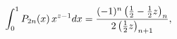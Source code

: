 \[\int_{0}^{1}\mathop{P_{2n}\/}\nolimits\!\left(x\right)x^{z-1}dx=\frac{(-1)^{n}%
\left(\frac{1}{2}-\frac{1}{2}z\right)_{n}}{2\left(\frac{1}{2}z\right)_{n+1}},\]